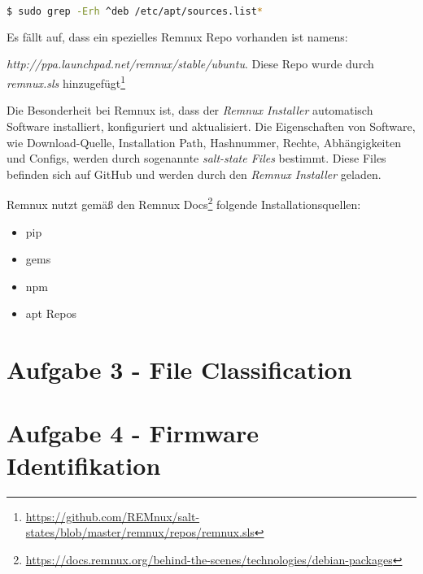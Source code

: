 \begin{lstlisting}[language=bash]
  $ sudo grep -Erh ^deb /etc/apt/sources.list*
\end{lstlisting}
Es fällt auf, dass ein spezielles Remnux Repo vorhanden ist namens:

\mbox{\textit{http://ppa.launchpad.net/remnux/stable/ubuntu}}. Diese Repo wurde durch \textit{remnux.sls} hinzugefügt\footnote{\url{https://github.com/REMnux/salt-states/blob/master/remnux/repos/remnux.sls}}

Die Besonderheit bei Remnux ist, dass der \textit{Remnux Installer} automatisch Software installiert, konfiguriert und aktualisiert.
Die Eigenschaften von Software, wie Download-Quelle, Installation Path, Hashnummer, Rechte, Abhängigkeiten und Configs, werden durch sogenannte \textit{salt-state Files} bestimmt.
Diese Files befinden sich auf GitHub und werden durch den \textit{Remnux Installer} geladen.

Remnux nutzt gemäß den Remnux Docs\footnote{\url{https://docs.remnux.org/behind-the-scenes/technologies/debian-packages}} folgende Installationsquellen:
\begin{itemize}
    \item pip
    \item gems
    \item npm
    \item apt Repos
\end{itemize}

\section*{Aufgabe 3 - File Classification}



\section*{Aufgabe 4 - Firmware Identifikation}



